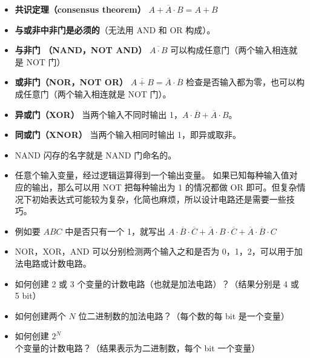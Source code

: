 \begin{itemize}
\item \textbf{共识定理（consensus theorem）} $A + \overline A \cdot B = A + B$
\item \textbf{与或非中非门是必须的}（无法用 AND 和 OR 构成）。
\item \textbf{与非门 （NAND，NOT AND）} $\overline{A\cdot B}$ 可以构成任意门（两个输入相连就是 NOT 门）
\item \textbf{或非门（NOR，NOT OR）} $\overline{A+B}=\overline A\cdot\overline B$ 检查是否输入都为零，也可以构成任意门（两个输入相连就是 NOT 门）。
\item \textbf{异或门（XOR）} 当两个输入不同时输出 1，$A\cdot\overline B+\overline A\cdot B$。
\item \textbf{同或门（XNOR）} 当两个输入相同时输出 1，即异或取非。
\item NAND 闪存的名字就是 NAND 门命名的。
\item 任意个输入变量，经过逻辑运算得到一个输出变量。 如果已知每种输入值对应的输出，那么可以用 NOT 把每种输出为 1 的情况都做 OR 即可。但复杂情况下初始表达式可能较为复杂，化简也麻烦，所以设计电路还是需要一些技巧。
\item 例如要 $ABC$ 中是否只有一个 1，就写出 $A\cdot\overline B\cdot\overline C + \overline A\cdot B\cdot\overline C + \overline A\cdot\overline B\cdot C$
\item NOR，XOR，AND 可以分别检测两个输入之和是否为 0，1，2，可以用于加法电路或计数电路。
\item 如何创建 2 或 3 个变量的计数电路（也就是加法电路）？（结果分别是 4 或 5 bit）
\item 如何创建两个 $N$ 位二进制数的加法电路？（每个数的每 bit 是一个变量）
\item 如何创建 $2^N$ 个变量的计数电路？（结果表示为二进制数，每个 bit 一个变量）
\end{itemize}
